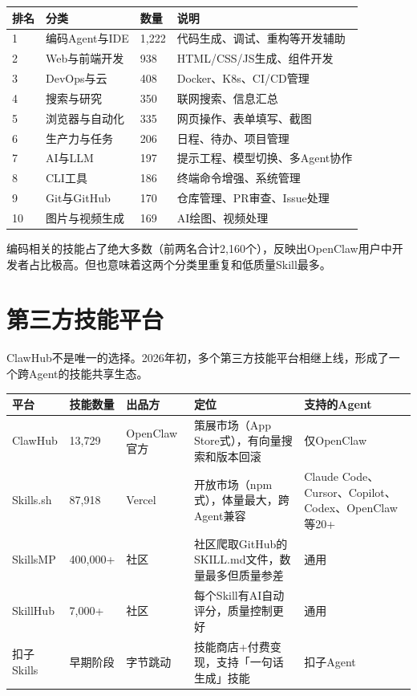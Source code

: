 \documentclass[
  10
]{article}
\newcounter{none} %
\begin{document}
{\def\LTcaptype{none} %
\begin{longtable}[]{@{}|l|l|l|l|@{}}
\toprule\noalign{}
\endhead
\bottomrule\noalign{}
\endlastfoot
\hline
排名 & 分类 & 数量 & 说明 \\
\hline
1 & 编码Agent与IDE & 1,222 & 代码生成、调试、重构等开发辅助 \\
\hline
2 & Web与前端开发 & 938 & HTML/CSS/JS生成、组件开发 \\
\hline
3 & DevOps与云 & 408 & Docker、K8s、CI/CD管理 \\
\hline
4 & 搜索与研究 & 350 & 联网搜索、信息汇总 \\
\hline
5 & 浏览器与自动化 & 335 & 网页操作、表单填写、截图 \\
\hline
6 & 生产力与任务 & 206 & 日程、待办、项目管理 \\
\hline
7 & AI与LLM & 197 & 提示工程、模型切换、多Agent协作 \\
\hline
8 & CLI工具 & 186 & 终端命令增强、系统管理 \\
\hline
9 & Git与GitHub & 170 & 仓库管理、PR审查、Issue处理 \\
\hline
10 & 图片与视频生成 & 169 & AI绘图、视频处理 \\
\hline
\end{longtable}
}

编码相关的技能占了绝大多数（前两名合计2,160个），反映出OpenClaw用户中开发者占比极高。但也意味着这两个分类里重复和低质量Skill最多。

\section{第三方技能平台}\label{ux7b2cux4e09ux65b9ux6280ux80fdux5e73ux53f0}

ClawHub不是唯一的选择。2026年初，多个第三方技能平台相继上线，形成了一个跨Agent的技能共享生态。

{\def\LTcaptype{none} %
\begin{longtable}[]{@{}|l|l|l|l|l|@{}}
\toprule\noalign{}
\endhead
\bottomrule\noalign{}
\endlastfoot
\hline
平台 & 技能数量 & 出品方 & 定位 & 支持的Agent \\
\hline
ClawHub & 13,729 & OpenClaw 官方 & 策展市场（App
Store式），有向量搜索和版本回滚 & 仅OpenClaw \\
\hline
Skills.sh & 87,918 & Vercel & 开放市场（npm式），体量最大，跨Agent兼容 &
Claude Code、Cursor、Copilot、Codex、OpenClaw等20+ \\
\hline
SkillsMP & 400,000+ & 社区 &
社区爬取GitHub的SKILL.md文件，数量最多但质量参差 & 通用 \\
\hline
SkillHub & 7,000+ & 社区 & 每个Skill有AI自动评分，质量控制更好 & 通用 \\
\hline
扣子Skills & 早期阶段 & 字节跳动 &
技能商店+付费变现，支持「一句话生成」技能 & 扣子Agent \\
\hline
\end{longtable}
}
\end{document}
